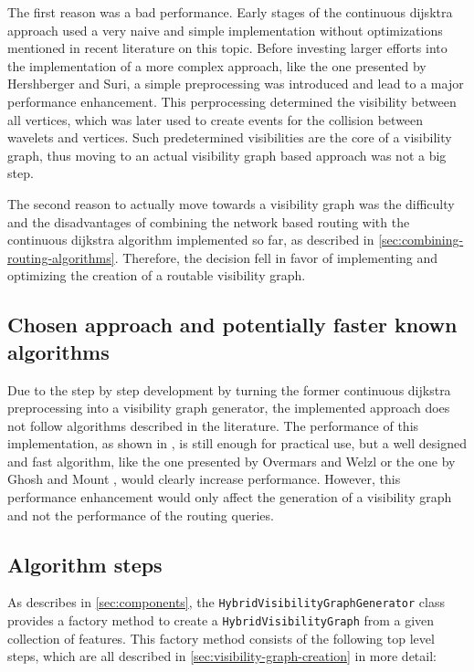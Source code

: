 		The first reason was a bad performance.
		Early stages of the continuous dijsktra approach used a very naive and simple implementation without optimizations mentioned in recent literature on this topic.
		Before investing larger efforts into the implementation of a more complex approach, like the one presented by Hershberger and Suri\cite{hershberger-suri}, a simple preprocessing was introduced and lead to a major performance enhancement.
		This perprocessing determined the visibility between all vertices, which was later used to create events for the collision between wavelets and vertices.
		Such predetermined visibilities are the core of a visibility graph, thus moving to an actual visibility graph based approach was not a big step.
		
		The second reason to actually move towards a visibility graph was the difficulty and the disadvantages of combining the network based routing with the continuous dijkstra algorithm implemented so far, as described in \cref{sec:combining-routing-algorithms}.
		Therefore, the decision fell in favor of implementing and optimizing the creation of a routable visibility graph.
	
	\subsection{Chosen approach and potentially faster known algorithms}

		Due to the step by step development by turning the former continuous dijkstra preprocessing into a visibility graph generator, the implemented approach does not follow algorithms described in the literature.
		The performance of this implementation, as shown in , is still enough for practical use, but a well designed and fast algorithm, like the one presented by Overmars and Welzl \cite{overmars-weizl-visibility-graph} or the one by Ghosh and Mount \cite{ghosh-output-sensitive-vgraph}, would clearly increase performance.
		However, this performance enhancement would only affect the generation of a visibility graph and not the performance of the routing queries.
			
	\subsection{Algorithm steps}
		
		As describes in \cref{sec:components}, the \texttt{HybridVisibilityGraphGenerator} class provides a factory method to create a \texttt{HybridVisibilityGraph} from a given collection of features.
		This factory method consists of the following top level steps, which are all described in \cref{sec:visibility-graph-creation} in more detail:
		
